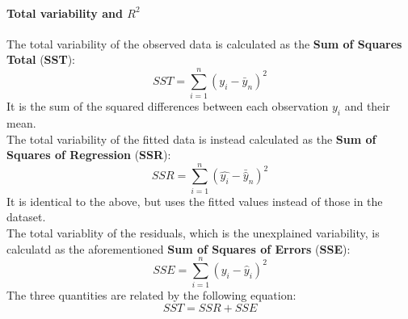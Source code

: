\paragraph{Total variability and $R^2$}
The total variability of the observed data is calculated as the \textbf{Sum of Squares Total} (\textbf{SST}):
\begin{equation*}
    SST = \sum_{i=1}^n (y_i - \bar{y}_n)^2
\end{equation*}   
It is the sum of the squared differences between each observation $y_i$ and their mean.\\
The total variability of the fitted data is instead calculated as the \textbf{Sum of Squares of Regression} (\textbf{SSR}):
\begin{equation*}
    SSR = \sum_{i=1}^n (\hat{y_i} - \bar{\hat{y}}_n)^2
\end{equation*}   
It is identical to the above, but uses the fitted values instead of those in the dataset.\\
The total variablity of the residuals, which is the unexplained variability, is calculatd as the aforementioned \textbf{Sum of Squares of Errors} (\textbf{SSE}):
\begin{equation*}
    SSE = \sum_{i=1}^n (y_i - \hat{y}_i)^2
\end{equation*}   
The three quantities are related by the following equation:
\begin{equation*}
    SST = SSR + SSE
\end{equation*}   


